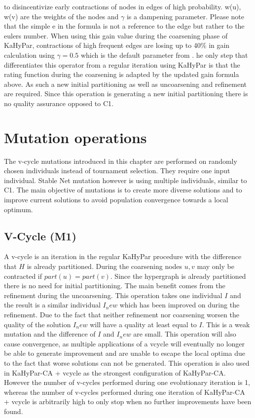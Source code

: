 \documentclass[a4paper,12pt,bibtotoc,titlepage, liststotoc,BCOR7mm,headsepline,pointlessnumbers]{scrbook}
\numberwithin{equation}{section}
\begin{document}
to disincentivize early contractions of nodes in edges of high probability. w(u), w(v) are the weights of the nodes and $\gamma$ is a dampening parameter. Please note that the simple e in the formula is not a reference to the edge but rather to the eulers number. When using this gain value during the coarsening phase of KaHyPar, contractions of high frequent edges are losing up to 40\% in gain calculation using $\gamma = 0.5$ which is the default parameter from \cite{wichlund1998multilevel}.
 he only step that differentiates this operator from a regular iteration using KaHyPar is that the rating function during the coarsening is adapted by the updated gain formula above. As such a new initial partitioning as well as uncoarsening and refinement are required. Since this operation is generating a new initial partitioning there is no quality assurance opposed to C1.
\section{Mutation operations}
The v-cycle mutations introduced in this chapter are performed on randomly chosen individuals instead of tournament selection. They require one input individual. Stable Net mutation however is using multiple individuals, similar to C1. The main objective of mutations is to create more diverse solutions and to improve current solutions to avoid population convergence towards a local optimum.
\subsection{V-Cycle (M1)}
A v-cycle is an iteration in the regular KaHyPar procedure with the difference that $H$ is already partitioned. During the coarsening nodes $u,v$ may only be contracted if $part(u) = part(v)$. Since the hypergraph is already partitioned there is no need for initial partitioning. The main benefit comes from the refinement during the uncoarsening. This operation takes one individual $I$ and the result is a similar individual $I_new$ which has been improved on during the refinement. Due to the fact that neither refinement nor coarsening worsen the quality of the solution $I_new$ will have a quality at least equal to $I$. This is a weak mutation and the difference of $I$ and $I_new$ are small. This operation will also cause convergence, as multiple applications of a vcycle will eventually no longer be able to generate improvement and are unable to escape the local optima due to the fact that worse solutions can not be generated. This operation is also used in KaHyPar-CA + vcycle as the strongest configuration of KaHyPar-CA. However the number of v-cycles performed during one evolutionary iteration is 1, whereas the number of v-cycles performed during one iteration of KaHyPar-CA + vcycle is arbitrarily high to only stop when no further improvements have been found.
\end{document}
